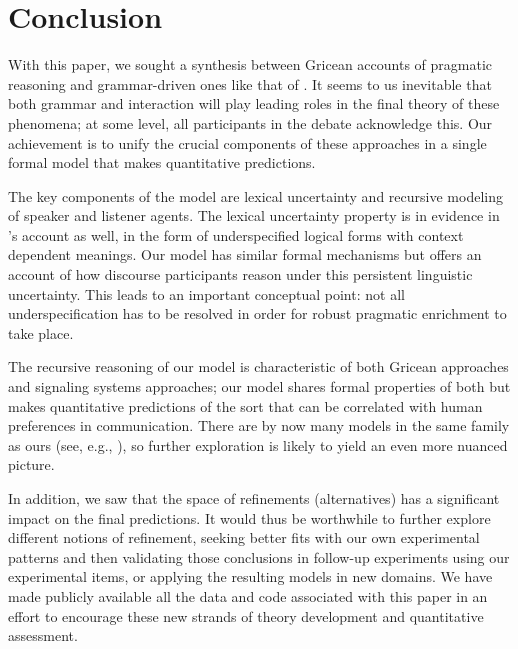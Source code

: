 \documentclass[leqno,12pt]{article}
\begin{document}

\section{Conclusion}\label{sec:conclusion}


With this paper, we sought a synthesis between Gricean accounts of
pragmatic reasoning and grammar-driven ones like that of
\citet{ChierchiaFoxSpector08}. It seems to us inevitable that both
grammar and interaction will play leading roles in the final theory of
these phenomena; at some level, all participants in the debate
acknowledge this. Our achievement is to unify the crucial components
of these approaches in a single formal model that makes quantitative
predictions.

The key components of the model are lexical uncertainty and recursive
modeling of speaker and listener agents. The lexical uncertainty
property is in evidence in \citeauthor{ChierchiaFoxSpector08}'s
account as well, in the form of underspecified logical forms with
context dependent meanings. Our model has similar formal mechanisms
but offers an account of how discourse participants reason under this
persistent linguistic uncertainty. This leads to an important
conceptual point: not all underspecification has to be resolved in
order for robust pragmatic enrichment to take place.

The recursive reasoning of our model is characteristic of both Gricean
approaches and signaling systems approaches; our model shares formal
properties of both but makes quantitative predictions of the sort that
can be correlated with human preferences in communication. There are
by now many models in the same family as ours (see, e.g.,
\citealt{CamererHo:2004,Jaeger:2011,Smith:Goodman:Frank:2013,Kao-etal:2014}),
so further exploration is likely to yield an even more nuanced
picture.

In addition, we saw that the space of refinements (alternatives) has a
significant impact on the final predictions. It would thus be
worthwhile to further explore different notions of refinement, seeking
better fits with our own experimental patterns and then validating
those conclusions in follow-up experiments using our experimental
items, or applying the resulting models in new domains.  We have made
publicly available all the data and code associated with this paper in
an effort to encourage these new strands of theory development and
quantitative assessment.




\setlength{\bibsep}{0pt}

\end{document}
